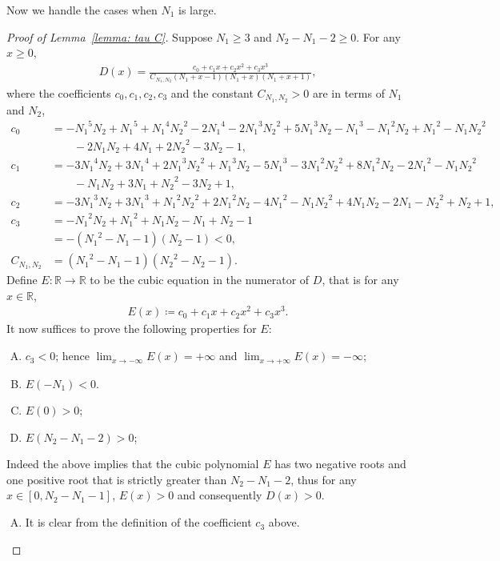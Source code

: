 \documentclass{ws-ijnt}
\begin{document}
	Now we handle the cases when $N_1$ is large.
	\begin{proof}[Proof of Lemma~\ref{lemma: tau C}]
		Suppose $N_1\geq 3$ and $N_2-N_1-2\geq0$. For any $x\geq0$,
		\begin{align*}
			D(x)=\frac{c_0+c_1x+c_2x^2+c_3x^3}{C_{N_1,N_2}(N_1+x-1)(N_1+x)(N_1+x+1)},
		\end{align*}
		where the coefficients $c_0,c_1,c_2,c_3$ and the constant $C_{N_1,N_2}>0$ are in terms of $N_1$ and $N_2$,
		\begin{align*}
			c_0&=-{N_1}^5{N_2}+{N_1}^5+{N_1}^4 {N_2}^2-2 {N_1}^4-2 {N_1}^3 {N_2}^2+5 {N_1}^3 {N_2}-{N_1}^3-{N_1}^2 {N_2}+{N_1}^2-{N_1} {N_2}^2\\
			&\qquad-2 {N_1} {N_2}+4 {N_1}+2 {N_2}^2-3 {N_2}-1, \\
			c_1&=-3 {N_1}^4 {N_2}+3 {N_1}^4+2 {N_1}^3 {N_2}^2+{N_1}^3 {N_2}-5 {N_1}^3-3 {N_1}^2 {N_2}^2+8 {N_1}^2 {N_2}-2 {N_1}^2-{N_1} {N_2}^2 \\
			&\qquad-{N_1} {N_2}+3 {N_1}+{N_2}^2-3 {N_2}+1, \\
			c_2&=-3 {N_1}^3 {N_2}+3 {N_1}^3+{N_1}^2 {N_2}^2+2 {N_1}^2 {N_2}-4 {N_1}^2-{N_1} {N_2}^2+4 {N_1} {N_2}-2 {N_1}-{N_2}^2+{N_2}+1, \\
			c_3
			&=-{N_1}^2{N_2}+{N_1}^2+{N_1} {N_2}-{N_1}+{N_2}-1 \\
			&=-({N_1}^2-N_1-1)(N_2-1)<0, \\
			C_{N_1,N_2}
			&= ({N_1}^2-N_1-1)({N_2}^2-N_2-1).
		\end{align*}
		Define $E:\mathbb{R}\to\mathbb{R}$ to be the cubic equation in the numerator of $D$, that is for any $x\in\mathbb{R}$,
		\begin{align*}
			E(x)\coloneqq{c_0+c_1x+c_2x^2+c_3x^3}.
		\end{align*}
		It now suffices to prove the following properties for $E$:
		\begin{enumerate}[A.]
			\item $c_3<0$; hence $\lim_{x\to-\infty} E(x) =+\infty$ and $\lim_{x\to+\infty} E(x) =-\infty$;
			\item $E(-N_1)<0$.
			\item $E(0)>0$;
			\item $E(N_2-N_1-2)>0$;
		\end{enumerate}
		Indeed the above implies that the cubic polynomial $E$ has two negative roots and one positive root that is strictly greater than $N_2-N_1-2$, thus for any $x\in[0,N_2-N_1-1]$, $E(x)>0$ and consequently $D(x)>0$.
		
		\begin{enumerate}[A.]
			\item It is clear from the definition of the coefficient $c_3$ above. 
			

\end{enumerate}
\end{proof}
\end{document}
